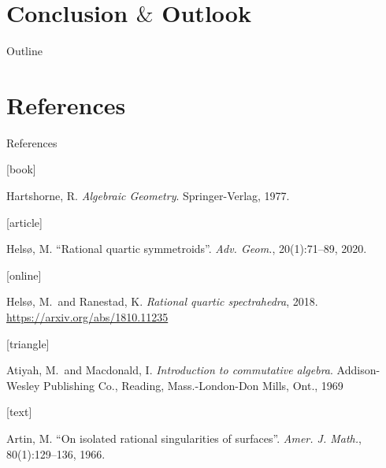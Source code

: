 \documentclass[UKenglish]{beamer}
\begin{document}
\section{Conclusion $\&$ Outlook}
\begin{frame}{Outline}
    \tableofcontents[currentsection]
\end{frame}




\section{References}


\begin{frame}[allowframebreaks]{References}
    \begin{thebibliography}{}

        [book]

        Hartshorne, R.
        \newblock \emph{Algebraic Geometry}.
        \newblock Springer-Verlag, 1977.

        [article]

        Helsø, M.
        \newblock \enquote{Rational quartic symmetroids}.
        \newblock \emph{Adv. Geom.}, 20(1):71--89, 2020.

        [online]

        Helsø, M.\ and Ranestad, K.
        \newblock \emph{Rational quartic spectrahedra}, 2018.
        \newblock \url{https://arxiv.org/abs/1810.11235}

        [triangle]

        Atiyah, M.\ and Macdonald, I.
        \newblock \emph{Introduction to commutative algebra}.
        \newblock Addison-Wesley Publishing Co., Reading, Mass.-London-Don
        Mills, Ont., 1969

        [text]

        Artin, M.
        \newblock \enquote{On isolated rational singularities of surfaces}.
        \newblock \emph{Amer. J. Math.}, 80(1):129--136, 1966.

    \end{thebibliography}
\end{frame}
\end{document}
